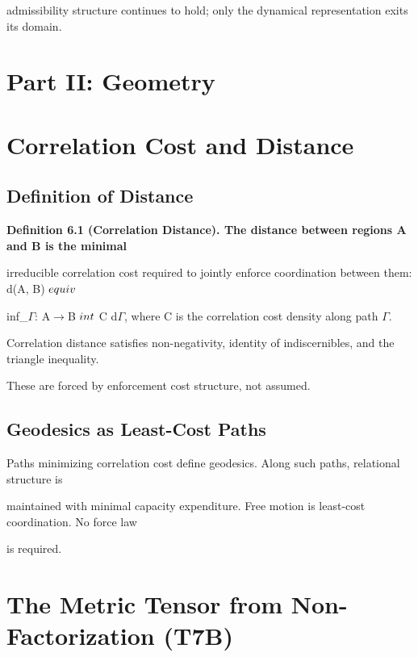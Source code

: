 \documentclass[11pt]{article}
\begin{document}
admissibility structure continues to hold; only the dynamical representation exits its domain.



\section*{Part II: Geometry}



\section{Correlation Cost and Distance}



\subsection{Definition of Distance}

\textbf{Definition 6.1 (Correlation Distance). The distance between regions A and B is the minimal}

irreducible correlation cost required to jointly enforce coordination between them: d(A, B) $\\equiv$

inf_{$\Gamma$: A$\to$B} $\\int$ C d$\Gamma$, where C is the correlation cost density along path $\Gamma$.



Correlation distance satisfies non-negativity, identity of indiscernibles, and the triangle inequality.

These are forced by enforcement cost structure, not assumed.



\subsection{Geodesics as Least-Cost Paths}

Paths minimizing correlation cost define geodesics. Along such paths, relational structure is

maintained with minimal capacity expenditure. Free motion is least-cost coordination. No force law

is required.



\section{The Metric Tensor from Non-Factorization (T7B)}
\end{document}
